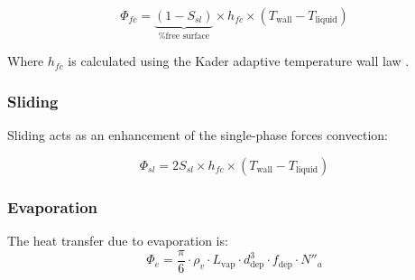 \begin{equation}
	\Phi_{fc}
	=
	\underbrace{(1-S_{sl})}_\text{\% free surface}
	\times
	h_{fc}
	\times
	(T_\text{wall}-T_\text{liquid})
\end{equation}

Where $h_{fc}$ is calculated using the Kader adaptive temperature wall law \cite{Kader1981}.

\subsubsection{Sliding}

Sliding acts as an enhancement of the single-phase forces convection:

\begin{equation}
	\Phi_{sl}
	=
	2 S_{sl}
	\times
	h_{fc}
	\times
	(T_\text{wall}-T_\text{liquid})
\end{equation}

\subsubsection{Evaporation}

The heat transfer due to evaporation is:
\begin{equation}
	\Phi_{e}
	=
	\frac{\pi}{6}
	\cdot
	\rho_v
	\cdot
	L_\text{vap}
	\cdot
	d_\text{dep}^3
	\cdot
	f_\text{dep}
	\cdot
	N''_a
\end{equation}